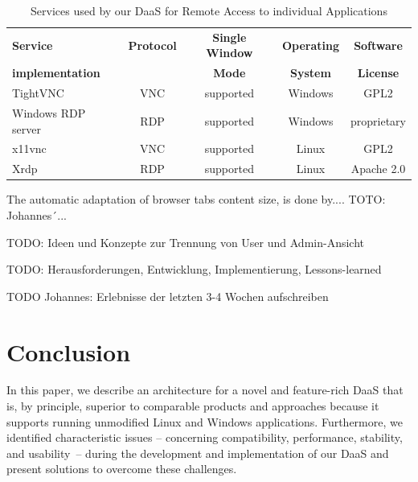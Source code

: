 \documentclass[runningheads]{llncs}
\begin{document}
\begin{table}
	\centering
	\caption{Services used by our DaaS for Remote Access to individual Applications}
	\begin{tabular}{|l|c|c|c|c|}
		\hline
		\textbf{Service}    &  \textbf{Protocol}  & \textbf{Single Window}       & \textbf{Operating} & \textbf{Software}  \\
		\textbf{implementation}  &                & \textbf{Mode}                & \textbf{System}    & \textbf{License}   \\
		\hline
		TightVNC            &  VNC                & supported                    & Windows            & GPL2               \\
		\hline
		Windows RDP server  &  RDP                & supported                    & Windows            & proprietary        \\
		\hline
		x11vnc              &  VNC                & supported                    & Linux              & GPL2               \\
		\hline
		Xrdp                &  RDP                & supported                    & Linux              & Apache 2.0         \\
		\hline
	\end{tabular}
	\label{tab:DaaS_Services_Overview}
\end{table}

The automatic adaptation of browser tabs content size, is done by.... TOTO: Johannes´...

TODO: Ideen und Konzepte zur Trennung von User und Admin-Ansicht

TODO: Herausforderungen, Entwicklung, Implementierung, Lessons-learned

TODO Johannes: Erlebnisse der letzten 3-4 Wochen aufschreiben



\section{Conclusion}
\label{sec:Conclusions}

In this paper, we describe an architecture for a novel and feature-rich DaaS that is, by principle, superior to comparable products and approaches because it supports running unmodified Linux and Windows applications. Furthermore, we identified characteristic issues -- concerning compatibility, performance, stability, and usability -- during the development and implementation of our DaaS and present solutions to overcome these challenges. 
\end{document}
